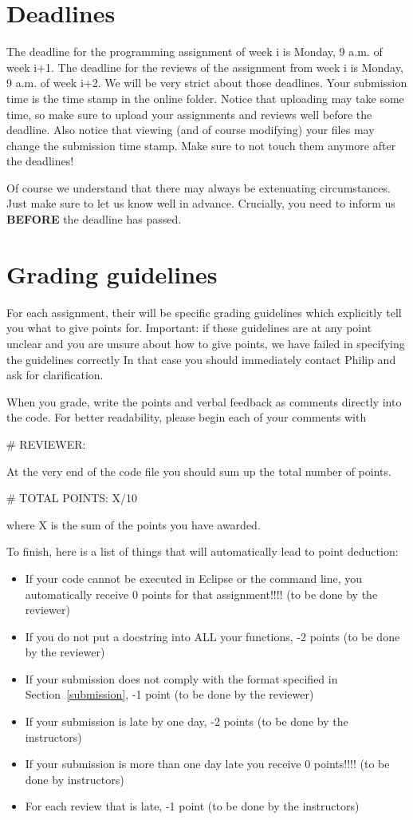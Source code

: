 \documentclass[a4paper, leqno, 11pt]{article}
\begin{document}
\section{Deadlines}
The deadline for the programming assignment of week i is Monday, 9 a.m. of week i+1. The deadline for the reviews of the assignment
from week i is Monday, 9 a.m. of week i+2. We will be very strict about those deadlines. Your submission time is the time stamp in
the online folder. Notice that uploading may take some time, so make sure to upload your assignments and reviews well before the deadline.
Also notice that viewing (and of course modifying) your files may change the submission time stamp. Make sure to not touch them anymore
after the deadlines!

Of course we understand that there may always be extenuating circumstances. Just make sure to let us know well in advance. Crucially,
you need to inform us \textbf{BEFORE} the deadline has passed.

\section{Grading guidelines}
For each assignment, their will be specific grading guidelines which explicitly tell you what to give points for. Important: if these
guidelines are at any point unclear and you are unsure about how to give points, we have failed in specifying the guidelines correctly
In that case you should immediately contact Philip and ask for clarification.

When you grade, write the points and verbal feedback as comments
directly into the code. For better readability, please begin each of
your comments with
\begin{center}
\# REVIEWER: 
\end{center}
At the very end of the code file you should sum up the total number of points. 
\begin{center}
\# TOTAL POINTS: X/10 
\end{center}
where X is the sum of the points you have awarded.

To finish, here is a list of things that will automatically lead to point deduction:
\begin{itemize}
\item If your code cannot be executed in Eclipse or the command line, you automatically receive 0 points for that assignment!!!! (to be done by the reviewer) 
\item If you do not put a docstring into ALL your functions, -2 points (to be done by the reviewer)
\item If your submission does not comply with the format specified in Section~\ref{submission}, -1 point (to be done by the reviewer)
\item If your submission is late by one day, -2 points (to be done by the instructors)
\item If your submission is more than one day late you receive 0 points!!!! (to be done by instructors)
\item For each review that is late, -1 point (to be done by the instructors)
\end{itemize}
\end{document}
